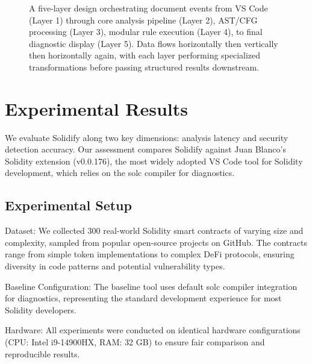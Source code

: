 \documentclass[10pt, a4paper]{article}
\begin{document}
\begin{figure}[H]
{
    }
    \caption{A five-layer design orchestrating document events from VS Code (Layer 1) through core analysis pipeline (Layer 2), AST/CFG processing (Layer 3), modular rule execution (Layer 4), to final diagnostic display (Layer 5). Data flows horizontally then vertically then horizontally again, with each layer performing specialized transformations before passing structured results downstream.}
    \label{fig:architecture}
\end{figure}

\section{Experimental Results}

We evaluate Solidify along two key dimensions: analysis latency and security detection accuracy. Our assessment compares Solidify against Juan Blanco's Solidity extension (v0.0.176), the most widely adopted VS Code tool for Solidity development, which relies on the solc compiler for diagnostics.

\subsection{Experimental Setup}

Dataset: We collected 300 real-world Solidity smart contracts of varying size and complexity, sampled from popular open-source projects on GitHub. The contracts range from simple token implementations to complex DeFi protocols, ensuring diversity in code patterns and potential vulnerability types.

Baseline Configuration: The baseline tool uses default solc compiler integration for diagnostics, representing the standard development experience for most Solidity developers.

Hardware: All experiments were conducted on identical hardware configurations (CPU: Intel i9-14900HX, RAM: 32 GB) to ensure fair comparison and reproducible results.
\end{document}

